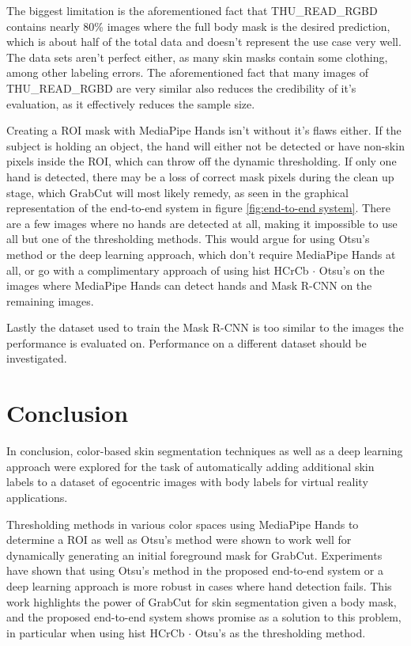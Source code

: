 \documentclass[conference]{IEEEtran}
\begin{document}
The biggest limitation is the aforementioned fact that THU\_READ\_RGBD contains nearly 80\% images where the full body mask is the desired prediction, which is about half of the total data and doesn't represent the use case very well. The data sets aren't perfect either, as many skin masks contain some clothing, among other labeling errors. The aforementioned fact that many images of THU\_READ\_RGBD are very similar also reduces the credibility of it's evaluation, as it effectively reduces the sample size.

Creating a ROI mask with MediaPipe Hands isn't without it's flaws either. If the subject is holding an object, the hand will either not be detected or have non-skin pixels inside the ROI, which can throw off the dynamic thresholding. If only one hand is detected, there may be a loss of correct mask pixels during the clean up stage, which GrabCut will most likely remedy, as seen in the graphical representation of the end-to-end system in figure \ref{fig:end-to-end system}. There are a few images where no hands are detected at all, making it impossible to use all but one of the thresholding methods. This would argue for using Otsu's method or the deep learning approach, which don't require MediaPipe Hands at all, or go with a complimentary approach of using hist HCrCb $\cdot$ Otsu's on the images where MediaPipe Hands can detect hands and Mask R-CNN on the remaining images.

Lastly the dataset used to train the Mask R-CNN is too similar to the images the performance is evaluated on. Performance on a different dataset should be investigated.

\section{Conclusion}

In conclusion, color-based skin segmentation techniques as well as a deep learning approach were explored for the task of automatically adding additional skin labels to a dataset of egocentric images with body labels for virtual reality applications.

Thresholding methods in various color spaces using MediaPipe Hands to determine a ROI as well as Otsu's method were shown to work well for dynamically generating an initial foreground mask for GrabCut. Experiments have shown that using Otsu's method in the proposed end-to-end system or a deep learning approach is more robust in cases where hand detection fails. This work highlights the power of GrabCut for skin segmentation given a body mask, and the proposed end-to-end system shows promise as a solution to this problem, in particular when using hist HCrCb $\cdot$ Otsu's as the thresholding method.
\end{document}
